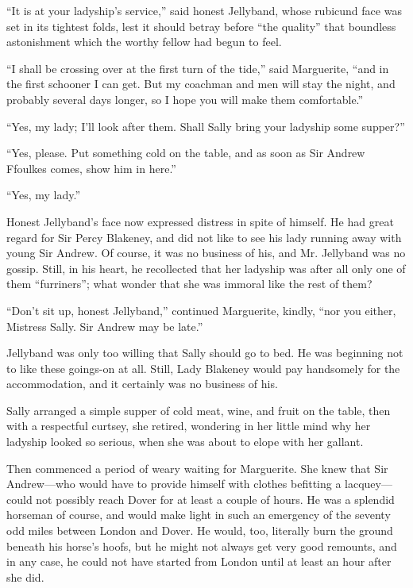 \documentclass[paper=5.5in:8.5in,BCOR=7mm,twoside,DIV=calc,12pt,usegeometry,chapterprefix,endperiod,headings=big]{scrbook}
\begin{document}
\enquote{It is at your ladyship's service,} said honest Jellyband, whose rubicund face was set in its tightest folds, lest it should betray before \enquote{the quality} that boundless astonishment which the worthy fellow had begun to feel.

\enquote{I shall be crossing over at the first turn of the tide,} said Marguerite, \enquote{and in the first schooner I can get. But my coachman and men will stay the night, and probably several days longer, so I hope you will make them comfortable.}

\enquote{Yes, my lady; I'll look after them. Shall Sally bring your ladyship some supper?}

\enquote{Yes, please. Put something cold on the table, and as soon as Sir Andrew Ffoulkes comes, show him in here.}

\enquote{Yes, my lady.}

Honest Jellyband's face now expressed distress in spite of himself. He had great regard for Sir Percy Blakeney, and did not like to see his lady running away with young Sir Andrew. Of course, it was no business of his, and Mr. Jellyband was no gossip. Still, in his heart, he recollected that her ladyship was after all only one of them \enquote{furriners}; what wonder that she was immoral like the rest of them?

\enquote{Don't sit up, honest Jellyband,} continued Marguerite, kindly, \enquote{nor you either, Mistress Sally. Sir Andrew may be late.}

Jellyband was only too willing that Sally should go to bed. He was beginning not to like these goings-on at all. Still, Lady Blakeney would pay handsomely for the accommodation, and it certainly was no business of his.

Sally arranged a simple supper of cold meat, wine, and fruit on the table, then with a respectful curtsey, she retired, wondering in her little mind why her ladyship looked so serious, when she was about to elope with her gallant.

Then commenced a period of weary waiting for Marguerite. She knew that Sir Andrew---who would have to provide himself with clothes befitting a lacquey---could not possibly reach Dover for at least a couple of hours. He was a splendid horseman of course, and would make light in such an emergency of the seventy odd miles between London and Dover. He would, too, literally burn the ground beneath his horse's hoofs, but he might not always get very good remounts, and in any case, he could not have started from London until at least an hour after she did.
\end{document}
